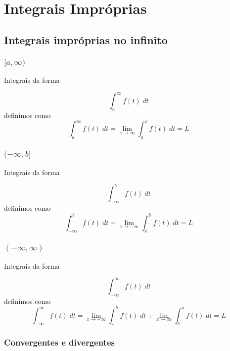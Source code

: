 \chapter{Integrais Impróprias}

\section{Integrais impróprias no infinito}

\subsection{\([a,\infty)\)}

Integrais da forma

\begin{equation}
    \int_{a}^{\infty} f(t) \; dt
\end{equation}
definimos como
\begin{equation}
    \int_{a}^{\infty} f(t) \; dt = \lim_{x \to \infty} \int_{a}^{x} f(t) \; dt = L
\end{equation}

\subsection{\((-\infty, b]\)}
Integrais da forma

\begin{equation}
    \int_{-\infty}^{b} f(t) \; dt
\end{equation}
definimos como
\begin{equation}
    \int_{-\infty}^{b} f(t) \; dt = \lim_{x \to -\infty} \int_{x}^{b} f(t) \; dt = L
\end{equation}

\subsection{\((-\infty, \infty)\)}
Integrais da forma

\begin{equation}
    \int_{-\infty}^{\infty} f(t) \; dt
\end{equation}
definimos como
\begin{equation}
    \int_{-\infty}^{\infty} f(t) \; dt = 
        \lim_{x \to -\infty} \int_{x}^{b} f(t) \; dt +  
        \lim_{x \to \infty} \int_{b}^{x} f(t) \; dt = L
\end{equation}

\subsection{Convergentes e divergentes}

